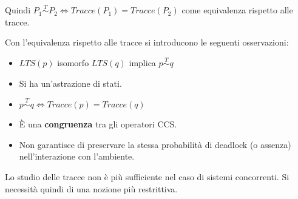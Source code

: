 \begin{definizione}
    Quindi $P_1 \stackrel{T}{\sim} P_2 \iff Tracce(P_1) = Tracce(P_2)$ come
    equivalenza rispetto alle tracce.
\end{definizione}
\begin{osservazione}
    Con l'equivalenza rispetto alle tracce si introducono le seguenti osservazioni:
    \begin{itemize}
        \item $LTS(p)$ isomorfo $LTS(q)$ implica $p \stackrel{T}{\sim} q$
        \item Si ha un'astrazione di stati.
        \item $p \stackrel{T}{\sim} q \iff Tracce(p) = Tracce(q)$
        \item È una \textbf{congruenza} tra gli operatori CCS.
        \item Non garantisce di preservare la stessa probabilità di deadlock (o
              assenza) nell'interazione con l'ambiente.
    \end{itemize}
\end{osservazione}
Lo studio delle tracce non è più sufficiente nel caso di sistemi concorrenti.
Si necessità quindi di una nozione più restrittiva.
